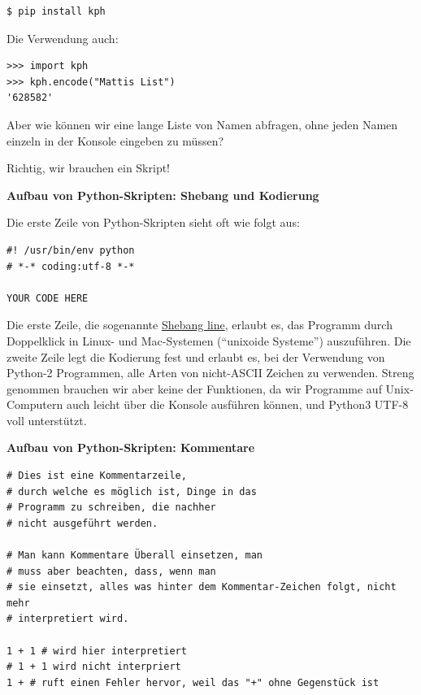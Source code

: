 \begin{verbatim}
$ pip install kph
\end{verbatim}

{Die Verwendung auch:}

\begin{verbatim}
>>> import kph
>>> kph.encode("Mattis List")
'628582'
\end{verbatim}

{Aber wie können wir eine lange Liste von Namen abfragen, ohne jeden
Namen einzeln in der Konsole eingeben zu müssen?}

{Richtig, wir brauchen ein Skript!}


\par\noindent\textbf{Aufbau von Python-Skripten: Shebang und Kodierung}

Die erste Zeile von Python-Skripten sieht oft wie folgt aus:

\begin{verbatim}
#! /usr/bin/env python
# *-* coding:utf-8 *-*

YOUR CODE HERE
\end{verbatim}

Die erste Zeile, die sogenannte
\href{http://de.wikipedia.org/wiki/Shebang}{Shebang line}, erlaubt es,
das Programm durch Doppelklick in Linux- und Mac-Systemen (``unixoide
Systeme'') auszuführen. Die zweite Zeile legt die Kodierung fest und
erlaubt es, bei der Verwendung von Python-2 Programmen, alle Arten von
nicht-ASCII Zeichen zu verwenden. Streng genommen brauchen wir aber
keine der Funktionen, da wir Programme auf Unix-Computern auch leicht
über die Konsole ausführen können, und Python3 UTF-8 voll unterstützt.



\par\noindent\textbf{Aufbau von Python-Skripten: Kommentare}

\begin{verbatim}
# Dies ist eine Kommentarzeile,
# durch welche es möglich ist, Dinge in das
# Programm zu schreiben, die nachher
# nicht ausgeführt werden.

# Man kann Kommentare Überall einsetzen, man 
# muss aber beachten, dass, wenn man
# sie einsetzt, alles was hinter dem Kommentar-Zeichen folgt, nicht mehr
# interpretiert wird.

1 + 1 # wird hier interpretiert
# 1 + 1 wird nicht interpriert
1 + # ruft einen Fehler hervor, weil das "+" ohne Gegenstück ist
\end{verbatim}

